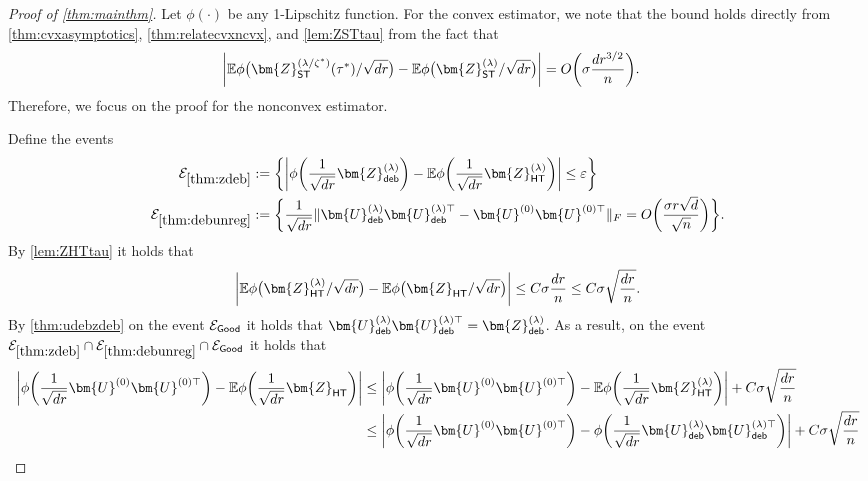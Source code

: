 \documentclass[10pt]{article}
\newcommand{\eps}{\ensuremath{\varepsilon}}
\newcommand{\s}{^*}
\theoremstyle{definition}
\begin{document}
\begin{proof}[Proof of \cref{thm:mainthm}]
Let $\phi(\cdot)$ be any 1-Lipschitz function. For the convex estimator, we note that the bound holds directly from \cref{thm:cvxasymptotics}, \cref{thm:relatecvxncvx}, and \cref{lem:ZSTtau} from the fact that
\begin{align*}
\bigg|    \mathbb{E} \phi\big( \bm{Z}_{{\sf ST}}^{(\lambda/\zeta\s)}(\tau\s) /\sqrt{dr}\big) - \mathbb{E} \phi \big( \bm{Z}_{{\sf ST}}^{(\lambda)}/\sqrt{dr} \big) \bigg| &= O \bigg( \sigma \frac{dr^{3/2}}{n} \bigg).
\end{align*}
Therefore, we focus on the proof for the nonconvex estimator. 

Define the events 
\begin{align}
   \mathcal{E}_{\mathrm{\cref{thm:zdeb}}} &:= \bigg\{ \bigg| \phi\bigg( \frac{1}{\sqrt{dr}} \bm{Z}^{(\lambda)}_{{\sf deb}} \bigg) - \mathbb{E} \phi \bigg( \frac{1}{\sqrt{dr}} \bm{Z}^{(\lambda)}_{{\sf HT}} \bigg) \bigg| \leq \eps \bigg\} \\
  \mathcal{E}_{\mathrm{\cref{thm:debunreg}}} &:= \bigg\{   \frac{1}{ \sqrt{dr}} \|  \bm{U}^{(\lambda)}_{{\sf deb}} \bm{U}^{(\lambda)\top }_{{\sf deb}} - \bm{U}^{(0)} \bm{U}^{(0)\top} \|_F = O\bigg( \frac{  \sigma r\sqrt{d}}{\sqrt{n}} \bigg) \bigg\}.
\end{align}
By \cref{lem:ZHTtau} it holds that
\begin{align*}
\bigg|    \mathbb{E} \phi\big( \bm{Z}_{{\sf HT}}^{(\lambda)}/\sqrt{dr} \big) - \mathbb{E} \phi\big( \bm{Z}_{{\sf HT}}/\sqrt{dr} \big) \bigg| \leq C \sigma \frac{dr}{n} \leq C \sigma \sqrt{\frac{dr}{n}}.
\end{align*}
By \cref{thm:udebzdeb} on the event $\mathcal{E}_{{\sf Good}}$ it holds that $\bm{U}^{(\lambda)}_{{\sf deb}} \bm{U}^{(\lambda)\top}_{{\sf deb}} = \bm{Z}_{{\sf deb}}^{(\lambda)}$.  As a result, on the event $\mathcal{E}_{\mathrm{\cref{thm:zdeb}}} \cap \mathcal{E}_{\mathrm{\cref{thm:debunreg}}}  \cap \mathcal{E}_{{\sf Good}}$ it holds that
\begin{align}
\bigg| \phi\bigg( \frac{1}{\sqrt{dr}} \bm{U}^{(0)} \bm{U}^{(0)\top} \bigg) - \mathbb{E} \phi \bigg( \frac{1}{\sqrt{dr}} \bm{Z}_{{\sf HT}} \bigg) \bigg| &\leq 
    \bigg| \phi \bigg( \frac{1}{\sqrt{dr}}\bm{U}^{(0)} \bm{U}^{(0)\top} \bigg) - \mathbb{E} \phi\bigg( \frac{1}{\sqrt{dr}} \bm{Z}^{(\lambda)}_{{\sf HT}} \bigg) \bigg| + C \sigma \sqrt{\frac{dr}{n}} \\
    &\leq \bigg| \phi \bigg( \frac{1}{\sqrt{dr}}\bm{U}^{(0)} \bm{U}^{(0)\top} \bigg) - \phi \bigg( \frac{1}{\sqrt{dr}} \bm{U}^{(\lambda)}_{{\sf deb}} \bm{U}^{(\lambda)\top}_{{\sf deb}} \bigg) \bigg|  + C \sigma \sqrt{\frac{dr}{n}} \\

\end{align}
\end{proof}
\end{document}
